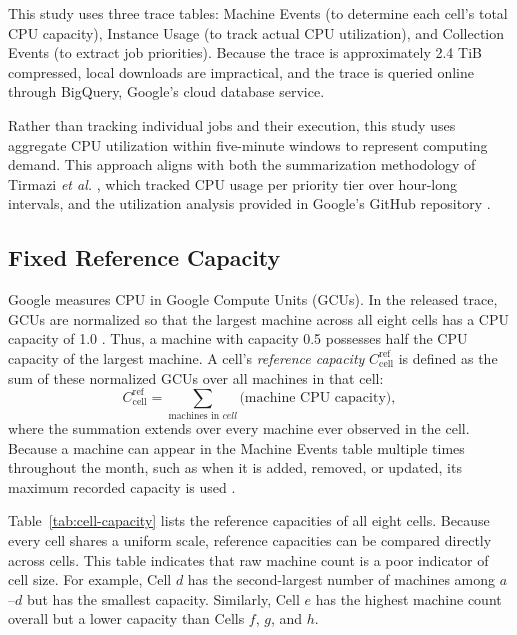 \documentclass{UNCC-thesis}
\begin{document}
This study uses three trace tables: Machine Events (to determine
each cell's total CPU capacity), Instance Usage (to track actual CPU utilization),
and Collection Events (to extract job priorities). Because the trace is approximately 2.4 TiB compressed, local downloads are impractical, and
the trace is queried online through BigQuery, Google's cloud database service.

Rather than tracking individual jobs and their execution, this study uses
aggregate CPU utilization within five-minute windows to represent computing
demand. This approach aligns with both the summarization methodology of Tirmazi \emph{et al.}
\cite{tirmazi2020borg}, which tracked CPU usage per priority tier over
hour-long intervals, and the utilization analysis provided in Google's GitHub
repository \cite{googleClusterAnalysisColab}.

\subsection{Fixed Reference Capacity}
\label{subsec:clusterdata-capacity}

Google measures CPU in Google Compute Units (GCUs). In the released trace, GCUs
are normalized so that the largest machine across all eight cells has a CPU
capacity of 1.0 \cite[p.~4]{wilkes2020clusterdata2019}. Thus, a machine with capacity
0.5 possesses half the CPU capacity of the largest machine. A cell's
\emph{reference capacity} \(C^{\mathrm{ref}}_{\mathrm{cell}}\) is defined as the
sum of these normalized GCUs over all machines in that cell:
\begin{equation}
  C^{\mathrm{ref}}_{\mathrm{cell}}
  =
  \sum_{\text{machines in } cell}
  \bigl(\text{machine CPU capacity}\bigr),
  \label{eq:reference-capacity}
\end{equation}
where the summation extends over every machine ever observed in the cell.
Because a machine can appear in the Machine Events table multiple times throughout the
month, such as when it is added, removed, or updated, its maximum recorded
capacity is used \cite{tirmazi2020borg, googleClusterAnalysisColab}.

Table~\ref{tab:cell-capacity} lists the reference capacities of all eight cells. Because every cell shares a uniform scale,
reference capacities can be compared directly across cells. This table
indicates that raw machine count is a poor indicator of cell size. For example,
Cell \(d\) has the second-largest number of machines among \(a\)--\(d\) but has
the smallest capacity. Similarly, Cell \(e\) has the highest machine count
overall but a lower capacity than Cells \(f\), \(g\), and \(h\).
\end{document}
